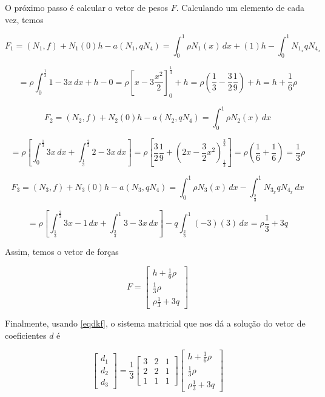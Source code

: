 \documentclass[12pt]{scrartcl}
\begin{document}
\endgroup

O próximo passo é calcular o vetor de pesos $F$. Calculando um elemento de cada vez, temos

\[
    F_1 = (N_1, f) + N_1(0)h - a\left(N_1, qN_4\right) = 
    \int_{0}^{1} \rho N_1(x) \, dx + (1)h - \int_{0}^{1} N_{1_x} qN_{4_x} 
\]

\[
    = \rho \int_{0}^{\frac{1}{3}}  1 - 3x \, dx + h - 0 = \rho \left[x - 3\frac{x^2}{2}\right]_{0}^{\frac{1}{3}} + h
     = \rho \left(\frac{1}{3} - \frac{3}{2}\frac{1}{9}\right) + h = h + \frac{1}{6}\rho
\]

\[
    F_2 = (N_2, f) + N_2(0)h - a\left(N_2, qN_4\right) = 
    \int_{0}^{1} \rho N_2(x) \, dx
\]

\[
    = \rho \left[\int_{0}^{\frac{1}{3}}  3x \, dx  + \int_{\frac{1}{3}}^{\frac{2}{3}}  2 - 3x \, dx\right] =
    \rho \left[\frac{3}{2}\frac{1}{9} + \left(2x - \frac{3}{2}x^2\right)_{\frac{1}{3}}^{\frac{2}{3}}  \right]
    = \rho \left(\frac{1}{6} + \frac{1}{6}\right) = \frac{1}{3}\rho 
\]

\[
    F_3 = (N_3, f) + N_3(0)h - a\left(N_3, qN_4\right) = 
    \int_{0}^{1} \rho N_3(x) \, dx - \int_{\frac{2}{3}}^{1} N_{3_x} qN_{4_x} \, dx 
\]

\[
    = \rho \left[\int_{\frac{1}{3}}^{\frac{2}{3}}  3x - 1 \, dx  + \int_{\frac{2}{3}}^{1}  3 - 3x \, dx\right] - q\int_{\frac{2}{3}}^{1} (-3) (3) \, dx =
    \rho \frac{1}{3} + 3q
\]

Assim, temos o vetor de forças

\begingroup
\renewcommand*{\arraystretch}{2}

\[
    F =
    \begin{bmatrix}
        h + \frac{1}{6}\rho    \\
        \frac{1}{3}\rho    \\
        \rho \frac{1}{3} + 3q
    \end{bmatrix}
\]

\endgroup

Finalmente, usando \eqref{eqdkf}, o sistema matricial que nos dá a solução do vetor de coeficientes $d$ é

\begingroup
\renewcommand*{\arraystretch}{2}

\[
    \begin{bmatrix}
        d_1    \\
        d_2    \\
        d_3
    \end{bmatrix} =
    \frac{1}{3}
    \begin{bmatrix}
        3  & 2 & 1  \\
        2 & 2  & 1 \\
        1  & 1 & 1
    \end{bmatrix}
    \begin{bmatrix}
        h + \frac{1}{6}\rho    \\
        \frac{1}{3}\rho    \\
        \rho \frac{1}{3} + 3q
    \end{bmatrix}
\]
\end{document}
